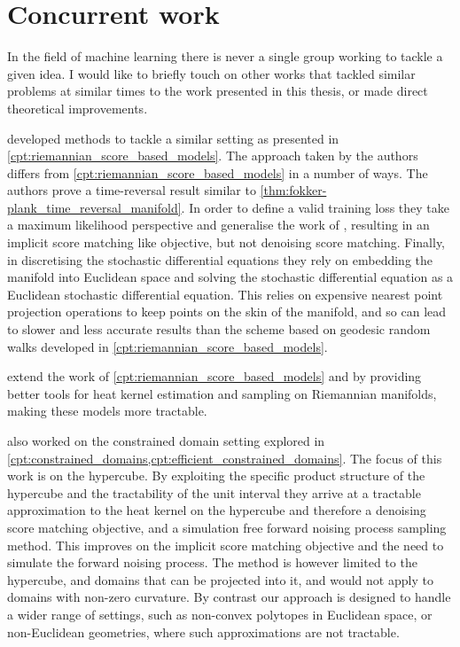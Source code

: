 \section{Concurrent work}

In the field of machine learning there is never a single group working to tackle a given idea. 
I would like to briefly touch on other works that tackled similar problems at similar times to the work presented in this thesis, or made direct theoretical improvements.

\textcite{huang2022riemannian} developed methods to tackle a similar setting as presented in \cref{cpt:riemannian_score_based_models}.
The approach taken by the authors differs from \cref{cpt:riemannian_score_based_models} in a number of ways.
The authors prove a time-reversal result similar to \cref{thm:fokker-plank_time_reversal_manifold}.
In order to define a valid training loss they take a maximum likelihood perspective and generalise the work of \textcite{huang2021variational,song2021maximum}, resulting in an implicit score matching like objective, but not denoising score matching.
Finally, in discretising the stochastic differential equations they rely on embedding the manifold into Euclidean space and solving the stochastic differential equation as a Euclidean stochastic differential equation.
This relies on expensive nearest point projection operations to keep points on the skin of the manifold, and so can lead to slower and less accurate results than the scheme based on geodesic random walks developed in \cref{cpt:riemannian_score_based_models}.

\textcite{lou2023scaling} extend the work of \cref{cpt:riemannian_score_based_models} and \textcite{huang2022riemannian} by providing better tools for heat kernel estimation and sampling on Riemannian manifolds, making these models more tractable.

\textcite{lou2023reflected} also worked on the constrained domain setting explored in \cref{cpt:constrained_domains,cpt:efficient_constrained_domains}.
The focus of this work is on the hypercube.
By exploiting the specific product structure of the hypercube and the tractability of the unit interval they arrive at a tractable approximation to the heat kernel on the hypercube and therefore a denoising score matching objective, and a simulation free forward noising process sampling method.
This improves on the implicit score matching objective and the need to simulate the forward noising process.
The method is however limited to the hypercube, and domains that can be projected into it, and would not apply to domains with non-zero curvature.
By contrast our approach is designed to handle a wider range of settings, such as non-convex polytopes in Euclidean space, or non-Euclidean geometries, where such approximations are not tractable.

